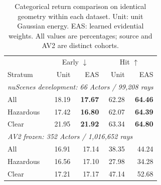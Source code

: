 \begin{table}[t]
\centering\footnotesize
\setlength{\tabcolsep}{5pt}
\caption{Categorical return comparison on identical geometry within each dataset. Unit: unit Gaussian energy.
EAS: learned evidential weights. All values are percentages; source and AV2 are distinct cohorts.}
\label{tab:eas-return}
\begin{tabular}{lrrrr}
\toprule
& \multicolumn{2}{c}{Early $\downarrow$} & \multicolumn{2}{c}{Hit $\uparrow$}\\
Stratum & Unit & EAS & Unit & EAS\\
\midrule
\multicolumn{5}{l}{\emph{nuScenes development: 66 Actors / 99,208 rays}}\\
All & 18.19 & \textbf{17.67} & 62.28 & \textbf{64.46} \\
Hazardous & 17.42 & \textbf{16.80} & 62.07 & \textbf{64.39} \\
Clear & 21.95 & \textbf{21.92} & 63.34 & \textbf{64.80} \\
\midrule
\multicolumn{5}{l}{\emph{AV2 frozen: 352 Actors / 1,016,652 rays}}\\
All & 16.91 & 17.14 & 38.35 & 44.24 \\
Hazardous & 16.56 & 17.10 & 27.98 & 34.28 \\
Clear & 17.21 & 17.17 & 47.14 & 52.68 \\
\bottomrule
\end{tabular}
\end{table}
